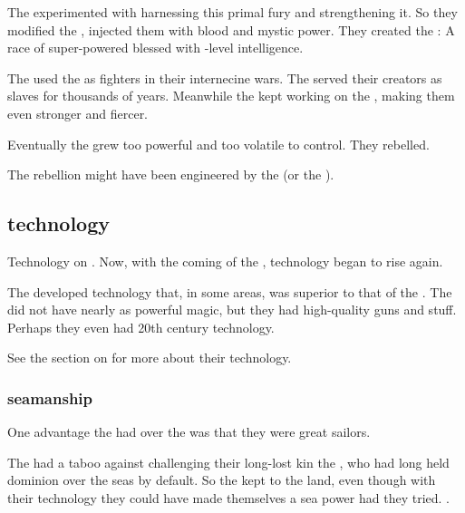 The \ophidians experimented with harnessing this primal fury and strengthening it.
So they modified the \nephilim, injected them with \daemonic blood and mystic power.
They created the \aryothim:
A race of super-powered \nephilim blessed with \quiljaar-level intelligence.

The \ophidians used the \aryothim as fighters in their internecine wars. 
The \aryothim served their creators as slaves for thousands of years.
Meanwhile the \ophidians kept working on the \aryothim, making them even stronger and fiercer. 

Eventually the \aryothim grew too powerful and too volatile to control.
They rebelled. 

The \aryoth rebellion might have been engineered by the  (or the ).









\subsection{\Aryoth technology}
Technology on \Miith {}. 
Now, with the coming of the \aryothim, technology began to rise again. 

The \aryothim developed technology that, in some areas, was superior to that of the \quiljaaran. 
The \aryothim did not have nearly as powerful magic, but they had high-quality guns and stuff.
Perhaps they even had 20th century technology. 

See the section on  for more about their technology.





\subsubsection{\Aryoth seamanship}
One advantage the \aryothim{} had over the \quiljaaran{} was that they were great sailors. 

The \quiljaaran{} had a taboo against challenging their long-lost kin the \nagae{}, who had long held dominion over the seas by default. 
So the \quiljaaran{} kept to the land, even though with their technology they could have made themselves a sea power had they tried. 
. 

